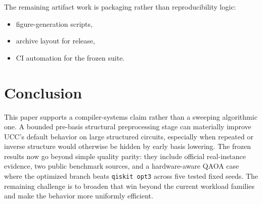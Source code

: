 \documentclass[11pt]{article}
\begin{document}
The remaining artifact work is packaging rather than reproducibility logic:
\begin{itemize}[leftmargin=1.5em]
    \item figure-generation scripts,
    \item archive layout for release,
    \item CI automation for the frozen suite.
\end{itemize} 

\section{Conclusion}

This paper supports a compiler-systems claim rather than a sweeping algorithmic one. A bounded pre-basis structural preprocessing stage can materially improve UCC's default behavior on large structured circuits, especially when repeated or inverse structure would otherwise be hidden by early basis lowering. The frozen results now go beyond simple quality parity: they include official real-instance evidence, two public benchmark sources, and a hardware-aware QAOA case where the optimized branch beats \texttt{qiskit opt3} across five tested fixed seeds. The remaining challenge is to broaden that win beyond the current workload families and make the behavior more uniformly efficient.
\end{document}
